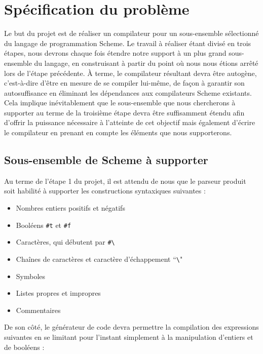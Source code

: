 \documentclass[12pt]{article}
\begin{document}
\section{Spécification du problème}
Le but du projet est de réaliser un compilateur pour un sous-ensemble sélectionné du langage de programmation Scheme. Le travail à réaliser étant divisé en trois étapes, nous devrons chaque fois étendre notre support à un plus grand sous-ensemble du langage, en construisant à partir du point où nous nous étions arrêté lors de l'étape précédente. À terme, le compilateur résultant devra être autogène, c'est-à-dire d'être en mesure de se compiler lui-même, de façon à garantir son autosuffisance en éliminant les dépendances aux compilateurs Scheme existants. Cela implique inévitablement que le sous-ensemble que nous chercherons à supporter au terme de la troisième étape devra être suffisamment étendu afin d'offrir la puissance nécessaire à l'atteinte de cet objectif mais également d'écrire le compilateur en prenant en compte les éléments que nous supporterons.

\subsection{Sous-ensemble de Scheme à supporter}
Au terme de l'étape 1 du projet, il est attendu de nous que le parseur produit soit habilité à supporter les constructions syntaxiques suivantes :

\begin{itemize}
\item Nombres entiers positifs et négatifs
\item Booléens \texttt{\#t} et \texttt{\#f}
\item Caractères, qui débutent par \texttt{\#\textbackslash}
\item Chaînes de caractères et caractère d'échappement ``\texttt{\textbackslash}"
\item Symboles
\item Listes propres et impropres
\item Commentaires
\end{itemize}

De son côté, le générateur de code devra permettre la compilation des expressions suivantes en se limitant pour l'instant simplement à la manipulation d'entiers et de booléens :
\end{document}
